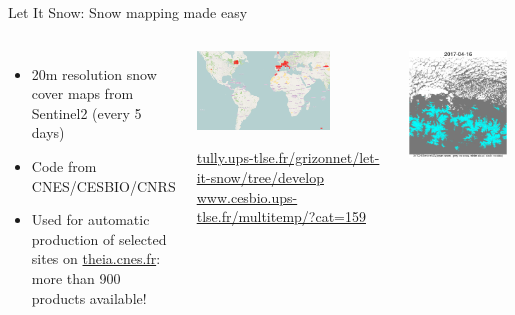 \begin{frame}{Let It Snow: Snow mapping made easy}

  \begin{columns}
  \begin{itemize}
    \item 20m resolution snow cover maps from Sentinel2 (every 5 days)
    \item Code from CNES/CESBIO/CNRS
    \item Used for automatic production of selected sites on \url{theia.cnes.fr}: more than 900 products available!
  \end{itemize}
  \begin{center}
    \includegraphics[width=0.7\textwidth]{images/lis-map.png}\\
    \begin{tiny}
      \url{tully.ups-tlse.fr/grizonnet/let-it-snow/tree/develop}\\
      \url{www.cesbio.ups-tlse.fr/multitemp/?cat=159}
    \end{tiny}
  \end{center}
  \begin{center}
    \includegraphics[width=0.95\textwidth]{images/lis-example.png}\\

\end{center}
\end{columns}
\end{frame}
